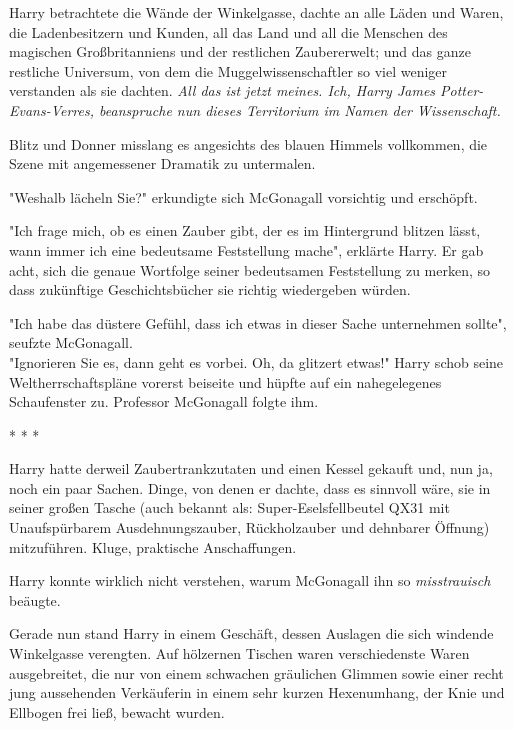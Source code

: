 {Harry betrachtete die Wände der Winkelgasse, dachte an alle Läden und Waren, die Ladenbesitzern und Kunden, all das Land und all die Menschen des magischen Großbritanniens und der restlichen Zaubererwelt; und das ganze restliche Universum, von dem die Muggelwissenschaftler so viel weniger verstanden als sie dachten. \emph{All das ist jetzt meines. Ich, Harry James Potter-Evans-Verres, beanspruche nun dieses Territorium im Namen der Wissenschaft.}

Blitz und Donner misslang es angesichts des blauen Himmels vollkommen, die Szene mit angemessener Dramatik zu untermalen.

"Weshalb lächeln Sie?" erkundigte sich McGonagall vorsichtig und erschöpft.

"Ich frage mich, ob es einen Zauber gibt, der es im Hintergrund blitzen lässt, wann immer ich eine bedeutsame Feststellung mache", erklärte Harry. Er gab acht, sich die genaue Wortfolge seiner bedeutsamen Feststellung zu merken, so dass zukünftige Geschichtsbücher sie richtig wiedergeben würden.

"Ich habe das düstere Gefühl, dass ich etwas in dieser Sache unternehmen sollte", seufzte McGonagall.\\ "Ignorieren Sie es, dann geht es vorbei. Oh, da glitzert etwas!" Harry schob seine Weltherrschaftspläne vorerst beiseite und hüpfte auf ein nahegelegenes Schaufenster zu. Professor McGonagall folgte ihm.

* * *

Harry hatte derweil Zaubertrankzutaten und einen Kessel gekauft und, nun ja, noch ein paar Sachen. Dinge, von denen er dachte, dass es sinnvoll wäre, sie in seiner großen Tasche (auch bekannt als: Super-Eselsfellbeutel QX31 mit Unaufspürbarem Ausdehnungszauber, Rückholzauber und dehnbarer Öffnung) mitzuführen. Kluge, praktische Anschaffungen.

Harry konnte wirklich nicht verstehen, warum McGonagall ihn so \emph{misstrauisch} beäugte.

Gerade nun stand Harry in einem Geschäft, dessen Auslagen die sich windende Winkelgasse verengten. Auf hölzernen Tischen waren verschiedenste Waren ausgebreitet, die nur von einem schwachen gräulichen Glimmen sowie einer recht jung aussehenden Verkäuferin in einem sehr kurzen Hexenumhang, der Knie und Ellbogen frei ließ, bewacht wurden.

}
